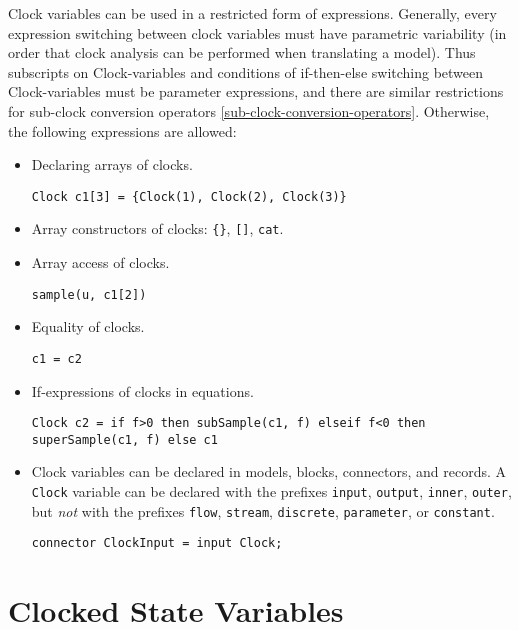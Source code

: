 Clock variables can be used in a restricted form of expressions.
Generally, every expression switching between clock variables must have
parametric variability (in order that clock analysis can be
performed when translating a model).
Thus subscripts on Clock-variables and conditions of if-then-else switching between Clock-variables must
be parameter expressions, and there are similar restrictions for sub-clock conversion operators \cref{sub-clock-conversion-operators}.
Otherwise, the following expressions are allowed:
\begin{itemize}
\item
  Declaring arrays of clocks.
  \begin{example}
  \lstinline!Clock c1[3] = {Clock(1), Clock(2), Clock(3)}!
  \end{example}
\item
  Array constructors of clocks: \lstinline!{}!, \lstinline![]!, \lstinline!cat!.
\item
  Array access of clocks.
  \begin{example}
  \lstinline!sample(u, c1[2])!
  \end{example}
\item
  Equality of clocks.
  \begin{example}
  \lstinline!c1 = c2!
  \end{example}
\item
  If-expressions of clocks in equations.
  \begin{example}
  \lstinline!Clock c2 = if f>0 then subSample(c1, f) elseif f<0 then superSample(c1, f) else c1!
  \end{example}
\item
  Clock variables can be declared in models, blocks, connectors, and
  records. A \lstinline!Clock! variable can be declared with the prefixes
  \lstinline!input!, \lstinline!output!, \lstinline!inner!, \lstinline!outer!, but
  \emph{not} with the prefixes \lstinline!flow!, \lstinline!stream!,
  \lstinline!discrete!, \lstinline!parameter!, or \lstinline!constant!.
  \begin{example}
  \lstinline!connector ClockInput = input Clock;!
  \end{example}
\end{itemize}

\section{Clocked State Variables}\label{clocked-state-variables}

